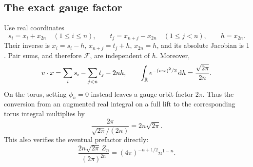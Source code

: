 \subsection{The exact gauge factor}
Use real coordinates
\[
s_i=x_i+x_{2n}\quad(1\leq i\leq n),\qquad
t_j=x_{n+j}-x_{2n}\quad(1\leq j<n),\qquad h=x_{2n}.
\]
Their inverse is $x_i=s_i-h$, $x_{n+j}=t_j+h$, $x_{2n}=h$, and its absolute Jacobian is $1$. Pair sums, and therefore $\mathcal F$, are independent of $h$. Moreover,
\[
v\cdot x=\sum_i s_i-\sum_{j<n}t_j-2nh,
\qquad
\int_{\mathbb R}e^{-(v\cdot x)^2/2}\,\mathrm d h=\frac{\sqrt{2\pi}}{2n}.
\]
On the torus, setting $\phi_n=0$ instead leaves a gauge orbit factor $2\pi$. Thus the conversion from an augmented real integral on a full lift to the corresponding torus integral multiplies by
\begin{equation}\label{sqt:eq:gaugefactor}
\frac{2\pi}{\sqrt{2\pi}/(2n)}=2n\sqrt{2\pi}.
\end{equation}
This also verifies the eventual prefactor directly:
\begin{equation}\label{sqt:eq:prefactor}
\frac{2n\sqrt{2\pi}\,Z_n}{(2\pi)^{2n}}
 =(4\pi)^{-n+1/2}n^{1-n}.
\end{equation}

